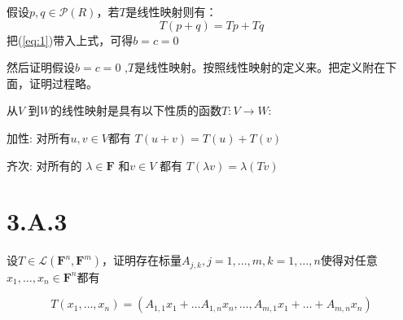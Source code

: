 \documentclass[10pt,a4paper,UTF8]{article}
\begin{document}
\begin{answer}
假设\(p,q\in \mathcal{P}(R)\)，若\(T\)是线性映射则有：
\[T(p + q) = Tp + Tq\]
把(\ref{eq:1})带入上式，可得\(b=c=0\)

然后证明假设\(b=c=0\) ,\(T\)是线性映射。按照线性映射的定义来。把定义附在下面，证明过程略。

\begin{definition}
从\(V\) 到\(W\)的线性映射是具有以下性质的函数\(T: V \rightarrow W\):

加性: 对所有\(u,v \in V\)都有 \(T(u+v) = T(u) + T(v)\)

齐次: 对所有的 \(\lambda \in \mathbf{F}\) 和\(v\in V\) 都有 \(T(\lambda v) = \lambda (Tv)\)
\end{definition}
\end{answer}
\section{3.A.3}
\label{sec:orgeb03743}


\begin{problem}
设\(T\in \mathcal{L}( \mathbf{F}^{n}, \mathbf{F}^{m})\)，证明存在标量\(A_{j,k},j=1,\ldots ,m,k=1,\ldots ,n\)使得对任意\(x_{1},\ldots ,x_{n}\in \mathbf{F}^{n}\)都有

\begin{equation}
\label{eq:2}
T(x_{1},\ldots ,x_{n}) = (A_{1,1}x_{1} + \ldots A_{1,n}x_{n} ,\ldots ,A_{m,1}x_{1} + \ldots +A_{m,n}x_{n})
\end{equation}
\end{problem}
\end{document}

